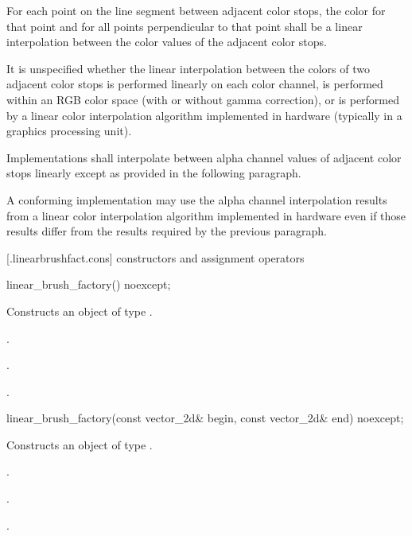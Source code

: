 \pnum
For each point on the line segment between adjacent color stops, the color for that point and for all points perpendicular to that point shall be a linear interpolation between the color values of the adjacent color stops.

\pnum
It is unspecified whether the linear interpolation between the colors of two adjacent color stops is performed linearly on each color channel, is performed within an RGB color space (with or without gamma correction), or is performed by a linear color interpolation algorithm implemented in hardware (typically in a graphics processing unit).

\pnum
Implementations shall interpolate between alpha channel values of adjacent color stops linearly except as provided in the following paragraph.

\pnum
A conforming implementation may use the alpha channel interpolation results from a linear color interpolation algorithm implemented in hardware even if those results differ from the results required by the previous paragraph.

 [\iotwod.linearbrushfact.cons] { constructors and assignment operators}

\begin{itemdecl}
    linear_brush_factory() noexcept;
\end{itemdecl}
\begin{itemdescr}
	\pnum
	\effects
	Constructs an object of type .
	
	\pnum
	\postconditions
	.
	
	.
	
	.
	
\end{itemdescr}

\begin{itemdecl}
    linear_brush_factory(const vector_2d& begin, const vector_2d& end) noexcept;
\end{itemdecl}
\begin{itemdescr}
	\pnum
	\effects
	Constructs an object of type .
	
	\pnum
	\postconditions
	.
	
	.
	
	.
	
\end{itemdescr}


